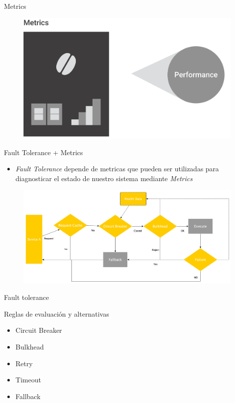 \documentclass{beamer}
\begin{document}
\begin{frame}{Metrics}
\begin{figure}
	\centering
	\includegraphics[width=0.75\linewidth]{Images/metrics}
\end{figure}
\end{frame}




\begin{frame}{Fault Tolerance + Metrics}

\begin{itemize}
	\item \textit{Fault Tolerance} depende de metricas que pueden ser utilizadas para diagnosticar el estado de nuestro sistema mediante \textit{Metrics}
\end{itemize}

\begin{figure}
	\centering
	\includegraphics[width=\linewidth]{Images/falldata}
\end{figure}

\end{frame}


\begin{frame}{Fault tolerance}

Reglas de evaluación y alternativas
\begin{itemize}
\item Circuit Breaker
\item Bulkhead
\item Retry
\item Timeout
\item Fallback
\end{itemize}

\end{frame}
\end{document}

